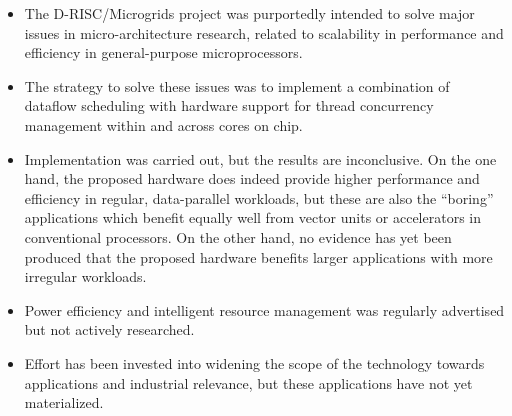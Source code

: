 \begin{summary}
\begin{itemize}
\item 
The D-RISC/Microgrids project was purportedly intended to solve major issues in
micro-architecture research, related to scalability in performance and
efficiency in general-purpose microprocessors. 
\item
The strategy to solve these issues was to implement a
combination of dataflow scheduling with hardware support for thread
concurrency management within and across cores on chip. 
\item
Implementation
was carried out, but the results are inconclusive. On the one hand, the proposed
hardware does indeed provide higher performance and efficiency in
regular, data-parallel workloads, but these are also the ``boring''
applications which benefit equally well from vector units or accelerators
in conventional processors. On the other hand, no evidence has yet
been produced that the proposed hardware benefits larger applications
with more irregular workloads. 
\item
Power efficiency and intelligent resource
management was regularly advertised but not actively researched.
\item
Effort has been invested into widening the scope of the technology
towards applications and industrial relevance, but these applications
have not yet materialized.
\end{itemize}
\end{summary}

